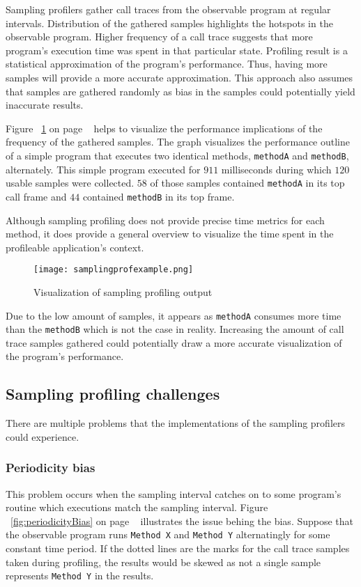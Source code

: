 \documentclass[..thesis.tex]{subfiles}
\begin{document}
Sampling profilers gather call traces from the observable program at regular intervals. Distribution of the gathered samples highlights the hotspots in the observable program. Higher frequency of a call trace suggests that more program's execution time was spent in that particular state. Profiling result is a statistical approximation of the program's performance. Thus, having more samples will provide a more accurate approximation. This approach also assumes that samples are gathered randomly as bias in the samples could potentially yield inaccurate results. 

Figure ~\ref{fig:samplingProf} on page ~\pageref{fig:samplingProf} helps to visualize the performance implications of the frequency of the gathered samples. The graph visualizes the performance outline of a simple program that executes two identical methods, \texttt{methodA} and \texttt{methodB}, alternately. This simple program executed for $911$ milliseconds during which $120$ usable samples were collected. $58$ of those samples contained \texttt{methodA} in its top call frame and $44$ contained \texttt{methodB} in its top frame.

Although sampling profiling does not provide precise time metrics for each method, it does provide a general overview to visualize the time spent in the profileable application's context. 

\begin{figure}[H]
\texttt{[image: samplingprofexample.png]}
\caption{Visualization of sampling profiling output}
\label{fig:samplingProf}
\end{figure}
Due to the low amount of samples, it appears as \texttt{methodA} consumes more time than the \texttt{methodB} which is not the case in reality. Increasing the amount of call trace samples gathered could potentially draw a more accurate visualization of the program's performance.

\subsection{Sampling profiling challenges}
There are multiple problems that the implementations of the sampling profilers could experience. 
\subsubsection{Periodicity bias}
This problem occurs when the sampling interval catches on to some program's routine which executions match the sampling interval. Figure ~\ref{fig:periodicityBias} on page ~\pageref{fig:periodicityBias} illustrates the issue behing the bias. Suppose that the observable program runs \texttt{Method X} and \texttt{Method Y} alternatingly for some constant time period. If the dotted lines are the marks for the call trace samples taken during profiling, the results would be skewed as not a single sample represents \texttt{Method Y} in the results.
\end{document}
